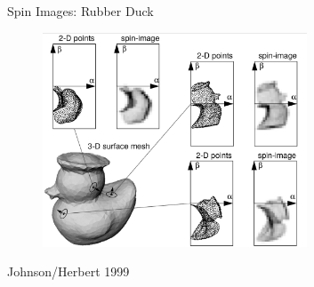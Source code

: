 \documentclass{beamer}
\begin{document}
\begin{frame}{Spin Images: Rubber Duck}

\begin{figure}[t]
	\centering
    \includegraphics[width=0.7\textwidth]{RubberDuck_SpinImages.png}
\end{figure}

\small Johnson/Herbert 1999

\end{frame}








\end{document}
